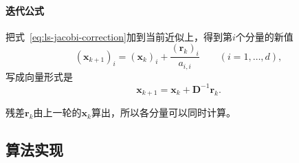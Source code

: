 \paragraph{迭代公式}
把式~\eqref{eq:ls-jacobi-correction}加到当前近似上，得到第$i$个分量的新值
\begin{equation}
 (\bm x_{k+1})_i=(\bm x_k)_i+\frac{(\bm r_k)_i}{a_{i,i}}\qquad(i=1,\ldots,d),
 \label{eq:ls-jacobi-update}
\end{equation}
写成向量形式是
\[
  \bm x_{k+1}=\bm x_k+\bm D^{-1}\bm r_k .
\]

残差$\bm r_k$由上一轮的$\bm x_k$算出，所以各分量可以同时计算。

\subsection{算法实现}

